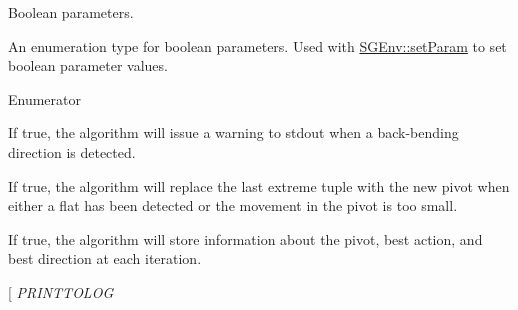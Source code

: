Boolean parameters. 

An enumeration type for boolean parameters. Used with \hyperlink{classSGEnv_a6edf7d4d2cdba8cba621420ff09d98ea}{S\-G\-Env\-::set\-Param} to set boolean parameter values. \begin{Desc}
\item[Enumerator]\par
\begin{description}
\item[{\em 
\hypertarget{classSGEnv_acff56acdb55b7734c7bc63c5ddf6af90aa0330f07e29bc2246c6bf564c7c14a43}{B\-A\-C\-K\-B\-E\-N\-D\-I\-N\-G\-W\-A\-R\-N\-I\-N\-G}\label{classSGEnv_acff56acdb55b7734c7bc63c5ddf6af90aa0330f07e29bc2246c6bf564c7c14a43}
}]If true, the algorithm will issue a warning to stdout when a back-\/bending direction is detected. \item[{\em 
\hypertarget{classSGEnv_acff56acdb55b7734c7bc63c5ddf6af90aec53dc68487b0eb417bc3d97d00106dd}{M\-E\-R\-G\-E\-T\-U\-P\-L\-E\-S}\label{classSGEnv_acff56acdb55b7734c7bc63c5ddf6af90aec53dc68487b0eb417bc3d97d00106dd}
}]If true, the algorithm will replace the last extreme tuple with the new pivot when either a flat has been detected or the movement in the pivot is too small. \item[{\em 
\hypertarget{classSGEnv_acff56acdb55b7734c7bc63c5ddf6af90aeeafd3b3d65296a2581dedb121168ed9}{S\-T\-O\-R\-E\-I\-T\-E\-R\-A\-T\-I\-O\-N\-S}\label{classSGEnv_acff56acdb55b7734c7bc63c5ddf6af90aeeafd3b3d65296a2581dedb121168ed9}
}]If true, the algorithm will store information about the pivot, best action, and best direction at each iteration. \item[{\em 
\hypertarget{classSGEnv_acff56acdb55b7734c7bc63c5ddf6af90a77e6100c348ce6f5449bd7f737d4e1a6}{P\-R\-I\-N\-T\-T\-O\-L\-O\-G}\label{classSGEnv_acff56acdb55b7734c7bc63c5ddf6af90a77e6100c348ce6f5449bd7f737d4e1a6}
}
\end{description}
\end{Desc}
